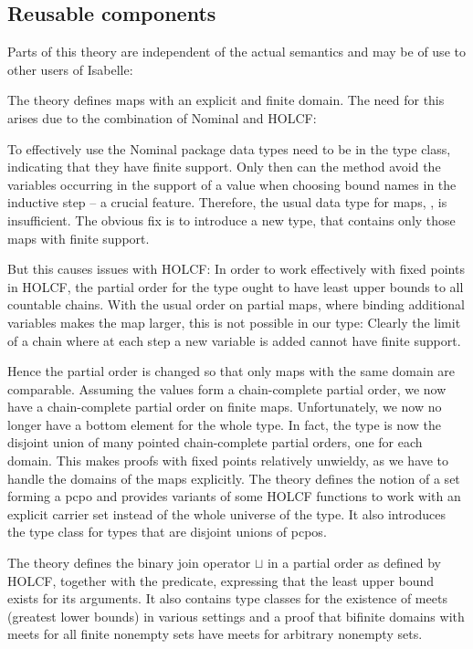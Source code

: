 \documentclass[11pt,a4paper,parskip=half]{scrartcl}
\begin{document}


\subsection{Reusable components}

Parts of this theory are independent of the actual semantics and may be of use to other users of Isabelle:

The theory  defines maps with an explicit and finite domain. The need for this arises due to the combination of Nominal and HOLCF:

To effectively use the Nominal package data types need to be in the  type class, indicating that they have finite support. Only then can the  method avoid the variables occurring in the support of a value when choosing bound names in the inductive step -- a crucial feature. Therefore, the usual data type for maps, , is insufficient. The obvious fix is to introduce a new type,  that contains only those maps with finite support.

But this causes issues with HOLCF: In order to work effectively with fixed points in HOLCF, the partial order for the type ought to have least upper bounds to all countable chains. With the usual order on partial maps, where binding additional variables makes the map larger, this is not possible in our type: Clearly the limit of a chain where at each step a new variable is added cannot have finite support.

Hence the partial order is changed so that only maps with the same domain are comparable. Assuming the values form a chain-complete partial order, we now have a chain-complete partial order on finite maps. Unfortunately, we now no longer have a bottom element for the whole type. In fact, the type is now the disjoint union of many pointed chain-complete partial orders, one for each domain. This makes proofs with fixed points relatively unwieldy, as we have to handle the domains of the maps explicitly. The theory  defines the notion of a set forming a pcpo and provides variants of some HOLCF functions to work with an explicit carrier set instead of the whole universe of the type. It also introduces the type class  for types that are disjoint unions of pcpos.

The theory  defines the binary join operator $\sqcup$ in a partial order as defined by HOLCF, together with the  predicate, expressing that the least upper bound exists for its arguments. It also contains type classes for the existence of meets (greatest lower bounds) in various settings and a proof that bifinite domains with meets for all finite nonempty sets have meets for arbitrary nonempty sets.
\end{document}

